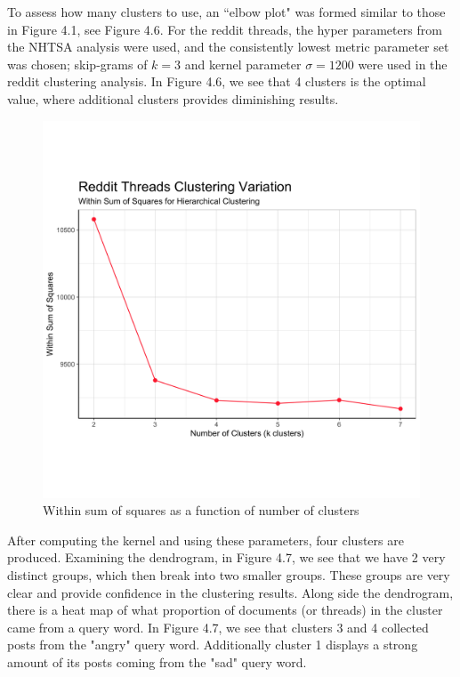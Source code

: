 To assess how many clusters to use, an ``elbow plot" was formed similar to those in Figure 4.1, see Figure 4.6. For the reddit threads, the hyper parameters from the NHTSA analysis were used, and the consistently lowest metric parameter set was chosen; skip-grams of $k=3$ and kernel parameter $\sigma = 1200$ were used in the reddit clustering analysis. In Figure 4.6, we see that 4 clusters is the optimal value, where additional clusters provides diminishing results. \\

\newpage

\begin{figure}
\includegraphics[width=6in]{Content/Images/reddit_wss.png}
\caption{Within sum of squares as a function of number of clusters}
\end{figure}

After computing the kernel and using these parameters, four clusters are produced. Examining the dendrogram, in Figure 4.7, we see that we have 2 very distinct groups, which then break into two smaller groups. These groups are very clear and provide confidence in the clustering results. Along side the dendrogram, there is a heat map of what proportion of documents (or threads) in the cluster came from a query word. In Figure 4.7, we see that clusters 3 and 4 collected posts from the "angry" query word. Additionally cluster 1 displays a strong amount of its posts coming from the "sad" query word. \\

